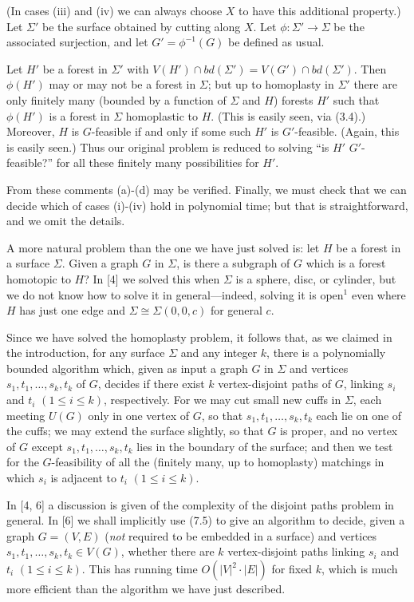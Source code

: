 \noindent (In cases (iii) and (iv) we can always choose $X$ to have this additional property.) Let $\Sigma'$ be the surface obtained by cutting along $X$. Let $\phi \colon \Sigma' \to \Sigma$ be the associated surjection, and let $G' = \phi^{-1}(G)$ be defined as usual.

Let $H'$ be a forest in $\Sigma'$ with $V(H') \cap bd(\Sigma') = V(G') \cap bd(\Sigma')$. Then $\phi(H')$ may or may not be a forest in $\Sigma$; but up to homoplasty in $\Sigma'$ there are only finitely many (bounded by a function of $\Sigma$ and $H$) forests $H'$ such that $\phi(H')$ is a forest in $\Sigma$ homoplastic to $H$. (This is easily seen, via (3.4).) Moreover, $H$ is $G$-feasible if and only if some such $H'$ is $G'$-feasible. (Again, this is easily seen.) Thus our original problem is reduced to solving ``is $H'$ $G'$-feasible?'' for all these finitely many possibilities for $H'$.

From these comments (a)-(d) may be verified. Finally, we must check that we can decide which of cases (i)-(iv) hold in polynomial time; but that is straightforward, and we omit the details.

A more natural problem than the one we have just solved is: let $H$ be a forest in a surface $\Sigma$. Given a graph $G$ in $\Sigma$, is there a subgraph of $G$ which is a forest homotopic to $H$? In [4] we solved this when $\Sigma$ is a sphere, disc, or cylinder, but we do not know how to solve it in general---indeed, solving it is open$^1$ even where $H$ has just one edge and $\Sigma \cong \Sigma(0, 0, c)$ for general $c$.

Since we have solved the homoplasty problem, it follows that, as we claimed in the introduction, for any surface $\Sigma$ and any integer $k$, there is a polynomially bounded algorithm which, given as input a graph $G$ in $\Sigma$ and vertices $s_1, t_1, \dots, s_k, t_k$ of $G$, decides if there exist $k$ vertex-disjoint paths of $G$, linking $s_i$ and $t_i$ $(1 \le i \le k)$, respectively. For we may cut small new cuffs in $\Sigma$, each meeting $U(G)$ only in one vertex of $G$, so that $s_1, t_1, \dots, s_k, t_k$ each lie on one of the cuffs; we may extend the surface slightly, so that $G$ is proper, and no vertex of $G$ except $s_1, t_1, \dots, s_k, t_k$ lies in the boundary of the surface; and then we test for the $G$-feasibility of all the (finitely many, up to homoplasty) matchings in which $s_i$ is adjacent to $t_i$ $(1 \le i \le k)$.

In [4, 6] a discussion is given of the complexity of the disjoint paths problem in general. In [6] we shall implicitly use (7.5) to give an algorithm to decide, given a graph $G = (V, E)$ (\textit{not} required to be embedded in a surface) and vertices $s_1, t_1, \dots, s_k, t_k \in V(G)$, whether there are $k$ vertex-disjoint paths linking $s_i$ and $t_i$ $(1 \le i \le k)$. This has running time $O(|V|^2 \cdot |E|)$ for fixed $k$, which is much more efficient than the algorithm we have just described.


